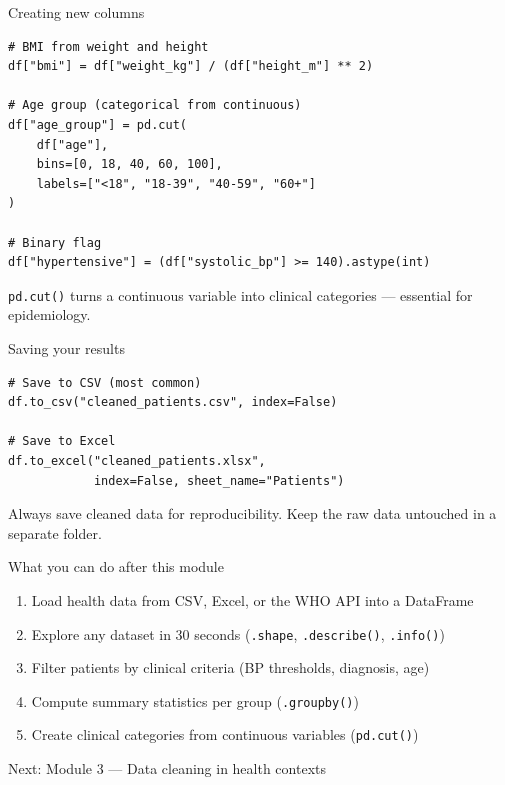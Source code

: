 \documentclass[aspectratio=169,11pt]{beamer}
\begin{document}
\begin{frame}[fragile]{Creating new columns}
\begin{verbatim}
# BMI from weight and height
df["bmi"] = df["weight_kg"] / (df["height_m"] ** 2)

# Age group (categorical from continuous)
df["age_group"] = pd.cut(
    df["age"],
    bins=[0, 18, 40, 60, 100],
    labels=["<18", "18-39", "40-59", "60+"]
)

# Binary flag
df["hypertensive"] = (df["systolic_bp"] >= 140).astype(int)
\end{verbatim}

\vspace{4pt}
\texttt{pd.cut()} turns a continuous variable into clinical categories --- essential for epidemiology.
\end{frame}

\begin{frame}[fragile]{Saving your results}
\begin{verbatim}
# Save to CSV (most common)
df.to_csv("cleaned_patients.csv", index=False)

# Save to Excel
df.to_excel("cleaned_patients.xlsx",
            index=False, sheet_name="Patients")
\end{verbatim}

\vspace{6pt}
Always save cleaned data for reproducibility. Keep the raw data untouched in a separate folder.
\end{frame}

\begin{frame}{What you can do after this module}
\begin{enumerate}
  \item Load health data from CSV, Excel, or the WHO API into a DataFrame
  \item Explore any dataset in 30 seconds (\texttt{.shape}, \texttt{.describe()}, \texttt{.info()})
  \item Filter patients by clinical criteria (BP thresholds, diagnosis, age)
  \item Compute summary statistics per group (\texttt{.groupby()})
  \item Create clinical categories from continuous variables (\texttt{pd.cut()})
\end{enumerate}

\vspace{12pt}
\centering
\Large \alert{Next: Module 3 --- Data cleaning in health contexts}
\end{frame}
\end{document}
